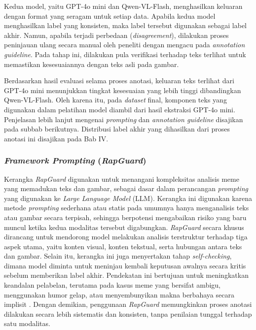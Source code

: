 Kedua model, yaitu GPT-4o mini dan Qwen-VL-Flash, menghasilkan keluaran dengan format yang seragam untuk setiap data. Apabila kedua model menghasilkan label yang konsisten, maka label tersebut digunakan sebagai label akhir. Namun, apabila terjadi perbedaan (\textit{disagreement}), dilakukan proses peninjauan ulang secara manual oleh peneliti dengan mengacu pada \textit{annotation guideline}. Pada tahap ini, dilakukan pula verifikasi terhadap teks terlihat untuk memastikan kesesuaiannya dengan teks asli pada gambar.

Berdasarkan hasil evaluasi selama proses anotasi, keluaran teks terlihat dari GPT-4o mini menunjukkan tingkat kesesuaian yang lebih tinggi dibandingkan Qwen-VL-Flash. Oleh karena itu, pada \textit{dataset} final, komponen teks yang digunakan dalam pelatihan model diambil dari hasil ekstraksi GPT-4o mini. Penjelasan lebih lanjut mengenai \textit{prompting} dan \textit{annotation guideline} disajikan pada subbab berikutnya. Distribusi label akhir yang dihasilkan dari proses anotasi ini disajikan pada Bab IV.

\subsubsection{\textit{Framework Prompting} (\textit{RapGuard})} \label{subsubsec:framework_prompting_rapguard}
Kerangka \textit{RapGuard} digunakan untuk menangani kompleksitas analisis meme yang memadukan teks dan gambar, sebagai dasar dalam perancangan \textit{prompting} yang digunakan ke \textit{Large Language Model} (LLM). Kerangka ini digunakan karena metode \textit{prompting} sederhana atau statis pada umumnya hanya menganalisis teks atau gambar secara terpisah, sehingga berpotensi mengabaikan risiko yang baru muncul ketika kedua modalitas tersebut digabungkan. \textit{RapGuard} secara khusus dirancang untuk mendorong model melakukan analisis terstruktur terhadap tiga aspek utama, yaitu konten visual, konten tekstual, serta hubungan antara teks dan gambar. Selain itu, kerangka ini juga menyertakan tahap \textit{self-checking}, dimana model diminta untuk meninjau kembali keputusan awalnya secara kritis sebelum memberikan label akhir. Pendekatan ini bertujuan untuk meningkatkan keandalan pelabelan, terutama pada kasus meme yang bersifat ambigu, menggunakan humor gelap, atau menyembunyikan makna berbahaya secara implisit \cite{Jiang2024RapGuard}. Dengan demikian, penggunaan \textit{RapGuard} memungkinkan proses anotasi dilakukan secara lebih sistematis dan konsisten, tanpa penilaian tunggal terhadap satu modalitas.


